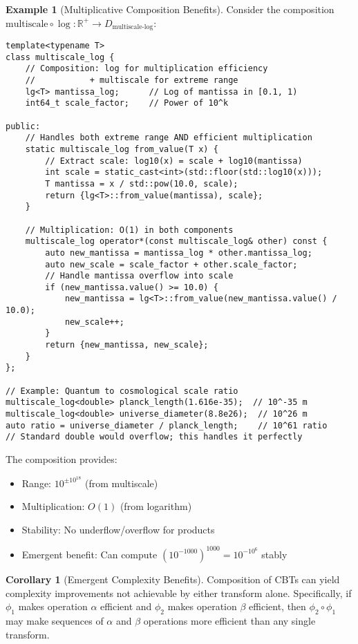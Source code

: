 \documentclass[11pt]{article}
\theoremstyle{definition}
\newtheorem{corollary}{Corollary}
\newtheorem{example}{Example}
\begin{document}
\begin{example}[Multiplicative Composition Benefits]
Consider the composition $\text{multiscale} \circ \log: \mathbb{R}^+ \to D_{\text{multiscale-log}}$:

\begin{lstlisting}[caption={Composed transform: multiscale<lg<T>>}]
template<typename T>
class multiscale_log {
    // Composition: log for multiplication efficiency
    //           + multiscale for extreme range
    lg<T> mantissa_log;      // Log of mantissa in [0.1, 1)
    int64_t scale_factor;    // Power of 10^k
    
public:
    // Handles both extreme range AND efficient multiplication
    static multiscale_log from_value(T x) {
        // Extract scale: log10(x) = scale + log10(mantissa)
        int scale = static_cast<int>(std::floor(std::log10(x)));
        T mantissa = x / std::pow(10.0, scale);
        return {lg<T>::from_value(mantissa), scale};
    }
    
    // Multiplication: O(1) in both components
    multiscale_log operator*(const multiscale_log& other) const {
        auto new_mantissa = mantissa_log * other.mantissa_log;
        auto new_scale = scale_factor + other.scale_factor;
        // Handle mantissa overflow into scale
        if (new_mantissa.value() >= 10.0) {
            new_mantissa = lg<T>::from_value(new_mantissa.value() / 10.0);
            new_scale++;
        }
        return {new_mantissa, new_scale};
    }
};

// Example: Quantum to cosmological scale ratio
multiscale_log<double> planck_length(1.616e-35);  // 10^-35 m
multiscale_log<double> universe_diameter(8.8e26);  // 10^26 m
auto ratio = universe_diameter / planck_length;    // 10^61 ratio
// Standard double would overflow; this handles it perfectly
\end{lstlisting}

The composition provides:
\begin{itemize}
\item Range: $10^{\pm 10^{18}}$ (from multiscale)
\item Multiplication: $O(1)$ (from logarithm)
\item Stability: No underflow/overflow for products
\item Emergent benefit: Can compute $(10^{-1000})^{1000} = 10^{-10^6}$ stably
\end{itemize}
\end{example}

\begin{corollary}[Emergent Complexity Benefits]
\label{cor:emergent}
Composition of CBTs can yield complexity improvements not achievable by either transform alone. Specifically, if $\phi_1$ makes operation $\alpha$ efficient and $\phi_2$ makes operation $\beta$ efficient, then $\phi_2 \circ \phi_1$ may make sequences of $\alpha$ and $\beta$ operations more efficient than any single transform.
\end{corollary}
\end{document}

